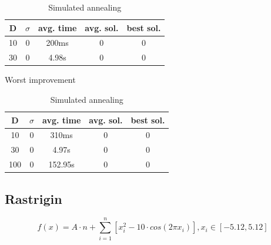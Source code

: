 \documentclass{article}
\begin{document}
\begin{table}[!htbp]
\begin{minipage}{.4\linewidth}
    \centering

    \begin{tabular}{|c|c|c|c|c|}
    \hline
    D   & $\sigma$  & avg. time     & avg. sol.     & best sol. \\
    \hline
    10  & 0         & 200ms         & 0             & 0 \\
    \hline
    30  & 0         & 4.98s         & 0             & 0 \\
    \hline
    \end{tabular}
    \caption{Worst improvement}
  \end{minipage}%
  \quad %
  \begin{minipage}{.75\linewidth}
    \centering

    \begin{tabular}{|c|c|c|c|c|}
    \hline
    D   & $\sigma$  & avg. time     & avg. sol.     & best sol. \\
    \hline
    10  & 0         & 310ms         & 0             & 0 \\
    \hline
    30  & 0         & 4.97s         & 0             & 0 \\
    \hline
    100 & 0         & 152.95s       & 0             & 0 \\
    \hline
    \end{tabular}
    \caption{Simulated annealing}
  \end{minipage}
\end{table}

\newpage
\setcounter{table}{0}


\subsection{Rastrigin}
$$ f(x) = A \cdot n + \sum_{i=1}^n \left[ x_i^2 - 10 \cdot cos(2 \pi x_i) \right] , x_i \in \left[ -5.12, 5.12 \right] $$

\end{document}
